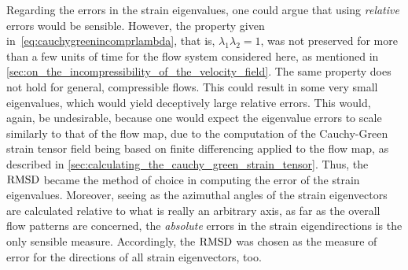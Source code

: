 %
Regarding the errors in the strain eigenvalues, one could argue that using
\emph{relative} errors would be sensible. However, the property
given in~\cref{eq:cauchygreenincomprlambda}, that is,
$\lambda_{1}\lambda_{2}=1$, was not preserved for more than a few units of
time for the flow system considered here, as mentioned in
\cref{sec:on_the_incompressibility_of_the_velocity_field}. The same property
does not hold for general, compressible flows. This could result in
some very small eigenvalues, which would yield deceptively large relative
errors. This would, again, be undesirable, because one would expect the
eigenvalue errors to scale similarly to that of the flow map, due to the
computation of the Cauchy-Green strain tensor field being based on finite
differencing applied to the flow map, as described in
\cref{sec:calculating_the_cauchy_green_strain_tensor}. Thus, the $\operatorname{RMSD}$
became the method of choice in computing the error of the strain eigenvalues.
Moreover, seeing as the azimuthal angles of the strain eigenvectors are
calculated relative to what is really an arbitrary axis, as far as the overall
flow patterns are concerned, the \emph{absolute} errors in the strain
eigendirections is the only sensible measure. Accordingly, the $\operatorname{RMSD}$ was
chosen as  the measure of error for the directions of all strain eigenvectors,
too.
%

